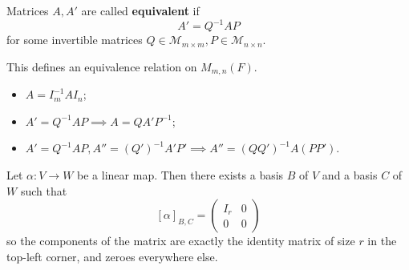\documentclass[a4paper]{article}
\begin{document}
\begin{definition}
	Matrices $ A, A' $ are called \textbf{equivalent} if
	\[
		A' = Q^{-1}AP
	\]
	for some invertible matrices $ Q\in \mathcal{M}_{m \times m}, P\in \mathcal{M}_{n \times n} $.
\end{definition}
\begin{remark}
	This defines an equivalence relation on $ M_{m,n}(F) $.
	\begin{itemize}
		\item $ A = I_m^{-1} A I_n $;
		\item $ A' = Q^{-1} AP \implies A = Q A' P^{-1} $;
		\item $ A' = Q^{-1}AP, A'' = (Q')^{-1}A'P' \implies A'' = (QQ')^{-1}A(PP') $.
	\end{itemize}
\end{remark}
\begin{proposition}
	Let $ \alpha \colon V \to W $ be a linear map.
	Then there exists a basis $ B $ of $ V $ and a basis $ C $ of $ W $ such that
	\[
		[\alpha]_{B,C} = \begin{pmatrix}
			I_r & 0 \\
			0   & 0
		\end{pmatrix}
	\]
	so the components of the matrix are exactly the identity matrix of size $ r $ in the top-left corner, and zeroes everywhere else.
\end{proposition}
\end{document}
